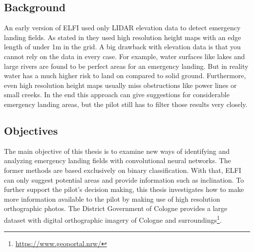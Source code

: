 \subsection{Background}
An early version of ELFI used only LIDAR elevation data to detect emergency landing fields. As stated in \cite{feu_elfi} they used high resolution height maps with an edge length of under 1m in the grid. A big drawback with elevation data is that you cannot rely on the data in every case. For example, water surfaces like lakes and large rivers are found to be perfect areas for an emergency landing. But in reality water has a much higher risk to land on compared to solid ground. Furthermore, even high resolution height maps usually miss obstructions like power lines or small creeks. In the end this approach can give suggestions for considerable emergency landing areas, but the pilot still has to filter those results very closely.



\subsection{Objectives}
The main objective of this thesis is to examine new ways of identifying and analyzing emergency landing fields with convolutional neural networks. The former methods are based exclusively on binary classification. With that, ELFI can only suggest potential areas and provide information such as inclination. To further support the pilot's decision making, this thesis investigates how to make more information available to the pilot by making use of high resolution orthographic photos. The District Government of Cologne provides a large dataset with digital orthographic imagery of Cologne and surroundings\footnote{\url{https://www.geoportal.nrw/}}.

